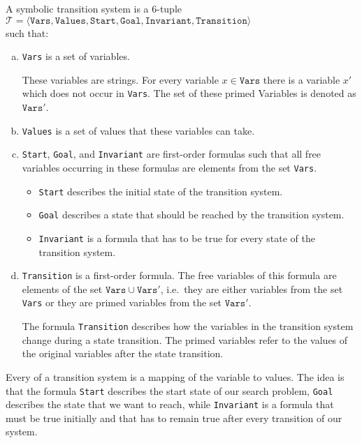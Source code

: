 \begin{Definition}
  A symbolic transition system is a 6-tuple
  \\[0.2cm]
  \hspace*{1.3cm}
  $\mathcal{T} = \langle \mathtt{Vars}, \mathtt{Values}, \mathtt{Start}, \mathtt{Goal}, \mathtt{Invariant}, \mathtt{Transition} \rangle$
  \\[0.2cm]
  such that:
  \begin{enumerate}[(a)]
  \item \texttt{Vars} is a set of variables.

        These variables are strings.  For every variable $x \in \texttt{Vars}$ there is a 
        variable $x'$ which does not occur in \texttt{Vars}.  The set of these primed Variables is denoted as
        $\mathtt{Vars}'$.
  \item \texttt{Values} is a set of values that these variables can take.
  \item \texttt{Start}, \texttt{Goal}, and \texttt{Invariant} are first-order formulas such that all free
         variables occurring in these formulas are elements from the set \texttt{Vars}.
         \begin{itemize}
         \item \texttt{Start} describes the initial state of the transition system.
         \item \texttt{Goal} describes a state that should be reached by the transition system.
         \item \texttt{Invariant} is a formula that has to be true for every state of the transition system.
         \end{itemize}
  \item \texttt{Transition} is a first-order formula.  The free variables of this formula are elements of
        the set $\texttt{Vars} \cup \mathtt{Vars}'$, i.e.~they are either variables from the set \texttt{Vars}
        or they are primed variables from the set $\mathtt{Vars}'$.

        The formula \texttt{Transition} describes how the variables in the transition system change during a
        state transition.  The primed variables refer to the values of the original variables after the
        state transition.
  \end{enumerate}
\end{Definition}
Every  of a transition system is a mapping of the variable to values.
The idea is that the formula \texttt{Start} describes the start state of our search problem, \texttt{Goal}
describes the state that we want to reach, while \texttt{Invariant} is a formula that must be true initially
and that has to remain true after every transition of our system.


